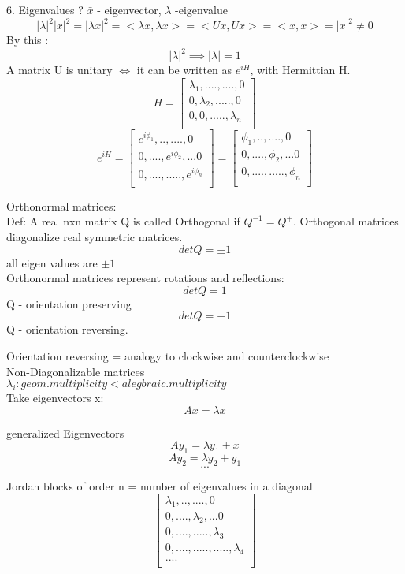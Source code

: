 \documentclass{article}
\begin{document}
6. Eigenvalues ? $\bar{x}$ - eigenvector, $\lambda$ -eigenvalue\\
$$ |\lambda|^2 |x|^2 =  |\lambda x|^2 = < \lambda x, \lambda x > = < Ux, Ux> = <x,x> = |x|^2 \neq 0 $$
By this :
$$ |\lambda|^2  \implies |\lambda| =1 $$
A matrix U is unitary $ \iff $ it can be written as $ e^{iH}$, with Hermittian H.\\
$$ H = 
\begin{bmatrix}
\lambda_1 , ....,...., 0\\
0, \lambda_2 , .....,  0 \\
0, 0, .....,  \lambda_n\\
\end{bmatrix}
$$
$$ 
e^{iH} = 
\begin{bmatrix}
e^{i\phi_1} ,..,...., 0\\
0,....,e^{i\phi_2}, ... 0 \\
0, ...., ....., e^{i\phi_n} \\
\end{bmatrix}
= \begin{bmatrix}
\phi_1 ,..,...., 0\\
0,....,\phi_2, ... 0 \\
0, ...., ....., \phi_n \\
\end{bmatrix}
$$

Orthonormal matrices:\\
Def: A real nxn matrix Q is called Orthogonal if $Q^{-1} = Q^+ $. Orthogonal matrices diagonalize real symmetric matrices.\\
$$ det Q = \pm 1$$ all eigen values are $\pm 1$ \\Orthonormal matrices represent rotations and reflections:
$$ det Q = 1$$ Q - orientation preserving
$$det Q = -1 $$ Q - orientation reversing.

Orientation reversing = analogy to clockwise and counterclockwise\\

Non-Diagonalizable matrices\\
$ \lambda_i: geom.multiplicity < alegbraic. multiplicity $\\
Take eigenvectors x: $$ Ax = \lambda x $$

generalized Eigenvectors $$ Ay_1 = \lambda y_1+x $$
$$  Ay_2 = \lambda y_2+y_1 $$
$$ ... $$

Jordan blocks of order n = number of eigenvalues in a diagonal
$$ \begin{bmatrix}
\lambda_1 ,..,...., 0\\
0,....,\lambda_2, ... 0 \\
0, ...., ....., \lambda_3 \\
0, ...., ....., .....,\lambda_4 \\
.... \\ 
\end{bmatrix}
$$






 
\end{document}
